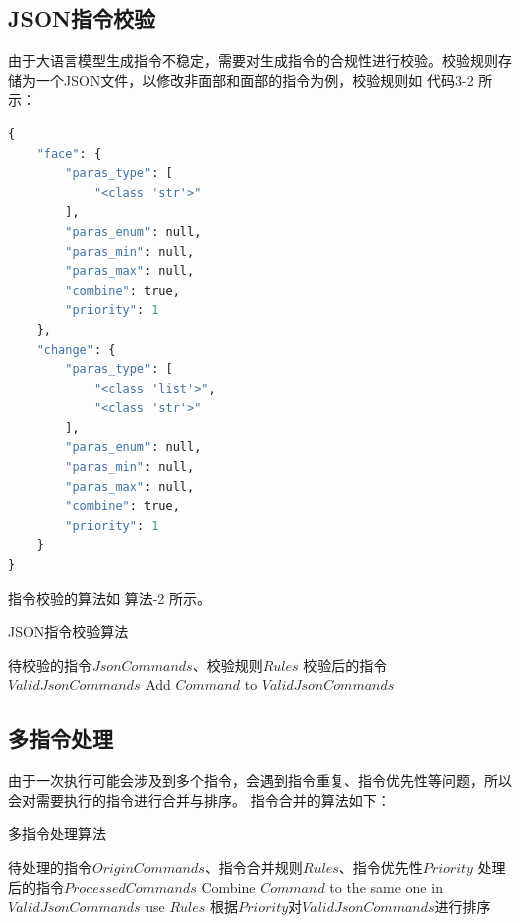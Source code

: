 \documentclass[a4paper,AutoFakeBold,oneside,12pt]{book}
\begin{document}
\subsection{JSON指令校验}
由于大语言模型生成指令不稳定，需要对生成指令的合规性进行校验。校验规则存储为一个JSON文件，以修改非面部和面部的指令为例，校验规则如 代码3-2 所示：
\begin{lstlisting}[language=Python, caption=指令校验规则, label=plus, tabsize=2]  
    {
    "face": {
        "paras_type": [
            "<class 'str'>"
        ],
        "paras_enum": null,
        "paras_min": null,
        "paras_max": null,
        "combine": true,
        "priority": 1
    },
    "change": {
        "paras_type": [
            "<class 'list'>",
            "<class 'str'>"
        ],
        "paras_enum": null,
        "paras_min": null,
        "paras_max": null,
        "combine": true,
        "priority": 1
    }
}
\end{lstlisting} 
指令校验的算法如 算法-2 所示。
\begin{algorithm} 
	\begin{spacing}{1.3}
		\caption{JSON指令校验算法} 
		\label{JsonCommandCheckAlgorithm}
		\renewcommand{\algorithmicrequire}{\textbf{输入：}}
		\renewcommand{\algorithmicensure}{\textbf{输出：}} 
			\begin{algorithmic}[1] 
				\Require 待校验的指令$JsonCommands$、校验规则$Rules$
				\Ensure 校验后的指令$ValidJsonCommands$
                        \State Add $Command$ to $ValidJsonCommands$
                    \EndIf
                \EndFor
			\end{algorithmic}
	\end{spacing}
\end{algorithm}

\subsection{多指令处理}
由于一次执行可能会涉及到多个指令，会遇到指令重复、指令优先性等问题，所以会对需要执行的指令进行合并与排序。
指令合并的算法如下：
\begin{algorithm} 
	\begin{spacing}{1.3}
		\caption{多指令处理算法} 
		\label{JsonCommandsProcessingAlgorithm}
		\renewcommand{\algorithmicrequire}{\textbf{输入：}}
		\renewcommand{\algorithmicensure}{\textbf{输出：}} 
			\begin{algorithmic}[1] 
				\Require 待处理的指令$OriginCommands$、指令合并规则$Rules$、指令优先性$Priority$
				\Ensure 处理后的指令$ProcessedCommands$
                        \State Combine $Command$ to the same one in $ValidJsonCommands$ use $Rules$
                    \EndIf
                \EndFor
                \State 根据$Priority$对$ValidJsonCommands$进行排序
			\end{algorithmic}
	\end{spacing}
\end{algorithm}
\end{document}
